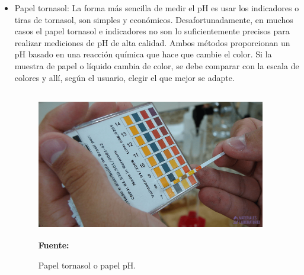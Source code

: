 \begin{itemize}
    \item Papel tornasol: La forma más sencilla de medir el pH es usar los indicadores o tiras de tornasol, son simples y econ\'omicos. Desafortunadamente, en muchos casos el papel tornasol e indicadores no son lo suficientemente precisos para realizar mediciones de pH de alta calidad. 
    Ambos m\'etodos proporcionan un pH basado en una reacci\'on química que hace que cambie el color. 
    Si la muestra de papel o l\'iquido cambia de color, se debe comparar con la escala de colores y all\'i, seg\'un el usuario, elegir el que mejor se adapte.
    
    \begin{figure}[ht]
        \centering
        \caption {Papel tornasol o papel pH. }
        \includegraphics[width=100mm, height=65mm]{Imagenes/cap2/Papel-tornasol-min.png}\\
        \textbf{Fuente:} \cite{noauthor_papel-tornasol-min-768x432png_nodate}
        \label{fig:tornasol}
    \end{figure}
    

\end{itemize}
